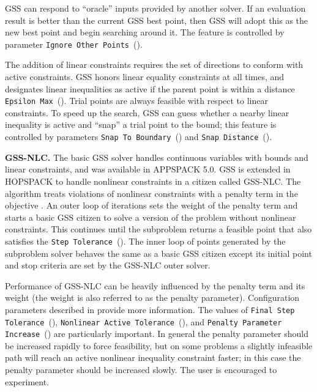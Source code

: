 GSS can respond to ``oracle'' inputs provided by another solver.  If an
evaluation result is better than the current GSS best point, then GSS will
adopt this as the new best point and begin searching around it.
The feature is controlled by parameter
{\tt Ignore Other Points}~().

The addition of linear constraints requires the set of directions to conform
with active constraints.  GSS honors linear equality constraints
at all times, and designates linear inequalities as active if the parent
point is within a distance {\tt Epsilon Max}~().
Trial points are always feasible with respect to linear constraints.
To speed up the search, GSS can guess whether a nearby linear inequality
is active and ``snap'' a trial point to the bound; this feature is controlled
by parameters {\tt Snap To Boundary}~() and
{\tt Snap Distance}~().

{\bf GSS-NLC.}
The basic GSS solver handles continuous variables with bounds and linear
constraints, and was available in APPSPACK 5.0.  GSS is extended in HOPSPACK
to handle nonlinear constraints in a citizen called GSS-NLC.
The algorithm treats violations of nonlinear
constraints with a penalty term in the objective \cite{GSS-GrKoSAND07}.
An outer loop of iterations sets the weight of the penalty term and starts
a basic GSS citizen to solve a version of the problem without nonlinear
constraints.  This continues until the subproblem returns a feasible point
that also satisfies the {\tt Step Tolerance}~().
The inner loop of points generated by the subproblem solver behaves the same
as a basic GSS citizen except its initial point and stop criteria are set
by the GSS-NLC outer solver.

Performance of GSS-NLC can be heavily influenced by the penalty term and its
weight (the weight is also referred to as the penalty parameter).
Configuration parameters described in  provide
more information.
The values of {\tt Final Step Tolerance}~(),
{\tt Nonlinear Active Tolerance}~(),
and {\tt Penalty Parameter Increase}~()
are particularly important.  In general the penalty parameter should be increased
rapidly to force feasibility, but on some problems a slightly infeasible path
will reach an active nonlinear inequality constraint faster; in this case
the penalty parameter should be increased slowly.  The user is encouraged
to experiment.

